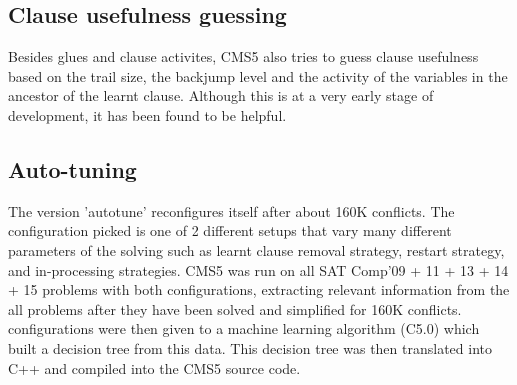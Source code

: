 \documentclass[final]{ieee}
\begin{document}
\subsection{Clause usefulness guessing}
Besides glues and clause activites, CMS5 also tries to guess clause usefulness based on the trail size, the backjump level and the activity of the variables in the ancestor of the learnt clause. Although this is at a very early stage of development, it has been found to be helpful.

\subsection{Auto-tuning}
The version 'autotune' reconfigures itself after about 160K conflicts. The configuration picked is one of 2 different setups that vary many different parameters of the solving such as learnt clause removal strategy, restart strategy, and in-processing strategies. CMS5 was run on all SAT Comp'09 + 11 + 13 + 14 + 15 problems with both configurations, extracting relevant information from the all problems after they have been solved and simplified for 160K conflicts.  configurations were then given to a machine learning algorithm (C5.0\cite{Quinlan:1993:CPM:152181}) which built a decision tree from this data. This decision tree was then translated into C++ and compiled into the CMS5 source code.




\vfill
\pagebreak
\end{document}
